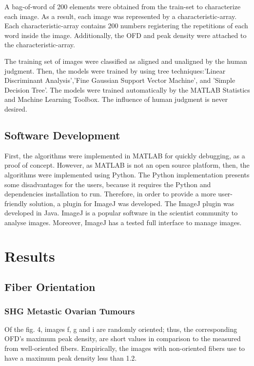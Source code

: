 \documentclass[12pt,a4paper]{article}
\begin{document}
A bag-of-word of 200 elements were obtained from the train-set to characterize each image. As a result, each image was represented by a characteristic-array. Each characteristic-array contains 200 numbers registering the repetitions of each word inside the image. Additionally, the OFD and peak density were attached to the characteristic-array.

The training set of images were classified as aligned and unaligned by the human judgment. Then, the  models were trained by using tree techniques:'Linear Discriminant Analysis','Fine Gaussian Support Vector Machine', and 'Simple Decision Tree'. The models were trained automatically by the MATLAB Statistics and Machine Learning Toolbox.  The influence of human judgment is never desired. 

\subsection{Software Development}
First, the algorithms were implemented in MATLAB for quickly debugging, as a proof of concept. However, as MATLAB is not an open source platform, then, the algorithms were implemented using Python. The Python implementation presents some disadvantages for the users, because it requires the Python and dependencies installation to run. Therefore, in order to provide a more user-friendly solution, a plugin for ImageJ was developed. The ImageJ plugin was developed in Java. ImageJ is a popular software in the scientist community to analyse images. Moreover, ImageJ has a tested full interface to manage images.

\section{Results}
\subsection{Fiber Orientation}
\subsubsection{SHG Metastic Ovarian Tumours}

Of the fig. 4, images f, g and i are randomly oriented; thus, the corresponding OFD's maximum peak density, are short values in comparison to the measured from well-oriented fibers. Empirically, the images with non-oriented fibers use to have a maximum peak density less than 1.2. 
\end{document}
